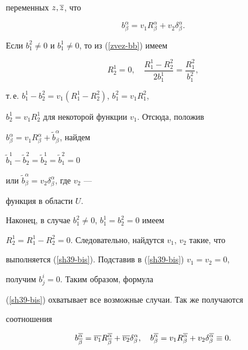 переменных $z,\overline z$, что


\begin{equation}


\label{sh39-bis}


b^\alpha_\beta = v_1 R^\alpha_\beta + v_2 \delta_\beta^\alpha.


\end{equation}





Если $b^2_1 \ne 0$ и $b^1_1 \ne 0$, то из (\ref{zvez-bb}) имеем


$$


R^1_2=0,\quad \frac{R^1_1 -R^2_2}{2 b^1_1}= \frac{R^2_1}{b^2_1},


$$


т.\,е. $b^1_1-b^2_2=v_1(R^1_1-R^2_2)$, $b^2_1 = v_1 R^2_1$,


$b^1_2= v_1 R^1_2$ для некоторой функции $v_1$. Отсюда, положив


$b^\alpha_\beta = v_1 R^\alpha_\beta + \widetilde b_\beta^\alpha $, найдем


$\widetilde b^1_1-\widetilde b^2_2=\widetilde b^1_2=\widetilde b^2_1 =0 $


или $\widetilde b^\alpha_\beta = v_2\delta^\alpha_\beta$, где $v_2$ ---


функция в области $U$.





Наконец, в случае $b^2_1 \ne 0$, $b^1_1=b^2_2=0$ имеем


$R^1_2=R^1_1-R^2_2=0$. Следовательно, найдутся $v_1$, $v_2$ такие, что


выполняется (\ref{sh39-bis}). Подставив в (\ref{sh39-bis}) $v_1=v_2=0$,


получим $b^i_j=0$. Таким образом, формула


(\ref{sh39-bis}) охватывает все возможные случаи. Так же получаются


соотношения


\begin{equation}


\label{sh39-1}


b^{\ol\alpha}_{\ol\beta} = \ol{v_1} R^{\ol\alpha}_{\ol\beta}


+ \ol{v_2} \delta_\beta^\alpha, \quad


b^{\ol\alpha}_\beta =


v_1 R^{\ol\alpha}_\beta + v_2 \delta_\beta^{\ol\alpha} \equiv 0.


\end{equation}



